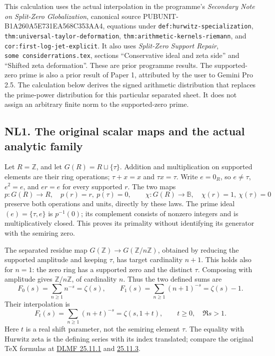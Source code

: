 \documentclass[
  10pt,
  a4paper,
]{article}
\begin{document}
This calculation uses the actual interpolation in the programme's
\emph{Secondary Note on Split-Zero Globalization}, canonical source
PUBUNIT-B1A260A5E731EA568C353AA4, equations under
\texttt{def:\allowbreak{}hurwitz-\allowbreak{}specialization},
\texttt{thm:\allowbreak{}universal-\allowbreak{}taylor-\allowbreak{}deformation},
\texttt{thm:\allowbreak{}arithmetic-\allowbreak{}kernels-\allowbreak{}riemann}, and
\texttt{cor:\allowbreak{}first-\allowbreak{}log-\allowbreak{}jet-\allowbreak{}explicit}. It also uses \emph{Split-Zero
Support Repair}, \texttt{some\ considerrations.\allowbreak{}tex}, sections
``Conservative ideal and zeta side'' and ``Shifted zeta deformation''.
These are prior programme results. The supported-zero prime is also a
prior result of Paper 1, attributed by the user to Gemini Pro 2.5. The
calculation below derives the signed arithmetic distribution that
replaces the prime-power distribution for this particular separated
sheet. It does not assign an arbitrary finite norm to the supported-zero
prime.

\subsection{NL1. The original scalar maps and the actual analytic
family}\label{nl1.-the-original-scalar-maps-and-the-actual-analytic-family}

Let \(R=\mathbb Z\), and let \(G(R)=R\sqcup\{\tau\}\). Addition and
multiplication on supported elements are their ring operations;
\(\tau+x=x\) and \(\tau x=\tau\). Write \(e=0_R\), so \(e\ne\tau\),
\(e^2=e\), and \(er=e\) for every supported \(r\). The two maps \[
p:G(R)\to R,\quad p(r)=r,\ p(\tau)=0,
\qquad
\chi:G(R)\to\mathbb B,\quad \chi(r)=1,\ \chi(\tau)=0
\tag{NL1}
\] preserve both operations and units, directly by these laws. The prime
ideal \((e)=\{\tau,e\}\) is \(p^{-1}(0)\); its complement consists of
nonzero integers and is multiplicatively closed. This proves its
primality without identifying its generator with the semiring zero.

The separated residue map \(G(\mathbb Z)\to G(\mathbb Z/n\mathbb Z)\),
obtained by reducing the supported amplitude and keeping \(\tau\), has
target cardinality \(n+1\). This holds also for \(n=1\): the zero ring
has a supported zero and the distinct \(\tau\). Composing with amplitude
gives \(\mathbb Z/n\mathbb Z\), of cardinality \(n\). Thus the two
defined sums are \[
F_0(s)=\sum_{n\ge1}n^{-s}=\zeta(s),\qquad
F_1(s)=\sum_{n\ge1}(n+1)^{-s}=\zeta(s)-1.
\tag{NL2}
\] Their interpolation is \[
F_t(s)=\sum_{n\ge1}(n+t)^{-s}=\zeta(s,1+t),\qquad t\ge0,\quad\Re s>1.
\tag{NL3}
\] Here \(t\) is a real shift parameter, not the semiring element
\(\tau\). The equality with Hurwitz zeta is the defining series with its
index translated; compare the original TeX formulas at
\href{https://dlmf.nist.gov/25.11.E1}{DLMF 25.11.1} and
\href{https://dlmf.nist.gov/25.11.E3}{25.11.3}.
\end{document}
